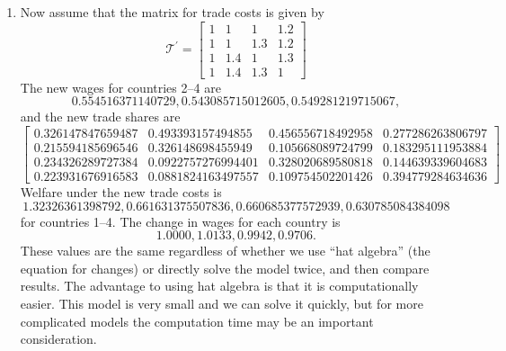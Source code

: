 \documentclass{article}
\begin{document}
\begin{enumerate}
	\item %
	Now assume that the matrix for trade costs is given by
	\[
    \mathcal{T^\prime} = 
    \begin{bmatrix}
    1 & 1 & 1 & 1.2 \\
    1 & 1 & 1.3 & 1.2 \\
    1 & 1.4 & 1 & 1.3 \\
    1 & 1.4 & 1.3 & 1
    \end{bmatrix} 
    \]
    The new wages for countries 2--4 are
    \[
    0.554516371140729,	0.543085715012605,	0.549281219715067,
    \]
    and the new trade shares are
        \[
        \begin{bmatrix}
0.326147847659487 &	0.493393157494855	& 0.456556718492958	& 0.277286263806797\\
0.215594185696546 &	0.326148698455949	& 0.105668089724799	& 0.183295111953884\\
0.234326289727384 &	0.0922757276994401	& 0.328020689580818	& 0.144639339604683\\
0.223931676916583 &	0.0881824163497557	& 0.109754502201426	& 0.394779284634636
    \end{bmatrix} 
    \]
    Welfare under the new trade costs is
    \[
    1.32326361398792,	0.661631375507836,	0.660685377572939,	0.630785084384098
    \]
    for countries 1--4. The change in wages for each country is
    \[
    1.0000,    1.0133,    0.9942,    0.9706.
    \]
    These values are the same regardless of whether we use ``hat algebra'' (the equation for changes) or directly solve the model twice, and then compare results. The advantage to using hat algebra is that it is computationally easier. This model is very small and we can solve it quickly, but for more complicated models the computation time may be an important consideration.
\end{enumerate}

\inputminted{octave}{Armington_code/Armington.m}
\end{document}
